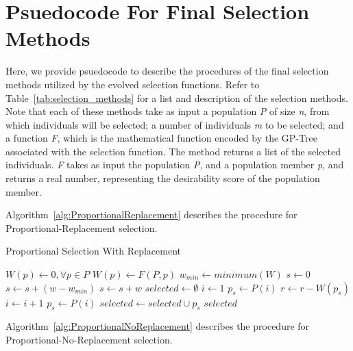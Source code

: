\documentclass[sigconf]{acmart}
\begin{document}
\appendix
\section{Psuedocode For Final Selection Methods}
\label{apx:SelectionPsuedocode}

Here, we provide psuedocode to describe the procedures of the final selection methods utilized by the evolved selection functions. Refer to Table~\ref{tab:selection_methods} for a list and description of the selection methods. Note that each of these methods take as input a population \textit{P} of size \textit{n}, from which individuals will be selected; a number of individuals \textit{m} to be selected; and a function \textit{F}, which is the mathematical function encoded by the GP-Tree associated with the selection function. The method returns a list of the selected individuals. \textit{F} takes as input the population \textit{P}, and a population member \textit{p}, and returns a real number, representing the desirability score of the population member.

Algorithm~\ref{alg:ProportionalReplacement} describes the procedure for Proportional-Replacement selection.

\begin{algorithm}
	\caption{Proportional Selection With Replacement}
	\label{alg:ProportionalReplacement}
	\begin{algorithmic}[1]
		 \label{proc:ProportionalReplacement}
		\State $W(p) \leftarrow 0,\forall p \in P$
		\State $W(p) \leftarrow F(P,p)$
		\EndFor
		\State $w_{min} \leftarrow minimum(W)$	
		\State $s \leftarrow 0$
		\State $s \leftarrow s + (w - w_{min} )$			
		\Else
		\State $s \leftarrow s + w$		
		\EndIf	
		\EndFor
		\State $selected \leftarrow \emptyset$
		\State $i \leftarrow 1$
		\State $p_s \leftarrow P(i)$
		\State $r \leftarrow r - W(p_s)$
		\State $i \leftarrow i + 1$
		\State $p_s \leftarrow P(i)$
		\EndWhile	
		\State $selected \leftarrow selected \cup p_s$
		\EndFor
		\State \Return $selected$
		\EndFunction
	\end{algorithmic}
\end{algorithm}

Algorithm~\ref{alg:ProportionalNoReplacement} describes the procedure for Proportional-No-Replacement selection.
\end{document}
